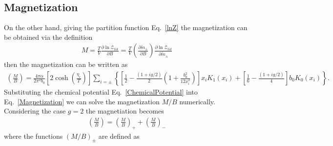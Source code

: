 \documentclass[Universe,article,submit,moreauthors,pdftex]{Definitions/mdpi}
\newcommand*{\req}[1]{Eq.~{\eqref{#1}}}
\begin{document}
\subsection{Magnetization}
On the other hand, giving the partition function \req{lnZ} the magnetization can be obtained via the definition
\begin{align}
M=\frac{T}{V}\frac{\partial \ln\mathcal{Z}_{tot}}{\partial B}=\frac{T}{V}\left(\frac{\partial\tilde m_\pm}{\partial B}\right)\frac{\partial \ln\mathcal{Z}_{tot}}{\partial\tilde m_\pm}
\end{align}
then the magnetization can be written as
\begin{align}\label{Magnetization}
\left(\frac{M}{B}\right)=\frac{4\pi\alpha}{2\pi^2b_0}\left[2\cosh\left(\frac{\eta_{e}}{T}\right)\right]\sum_{i=\pm}\left\{\left[\frac{1}{2}-\frac{(1+i g/2)}{2}\left(1+\frac{b^2_0}{12x^2_i}\right)\right]x_i K_1(x_i)+\left[\frac{1}{6}-\frac{(1+ig/2)}{4}\right]b_0K_0(x_i)\right\}.
\end{align}
Substituting the chemical potential \req{ChemicalPotential} into \req{Magnetization} we can solve the magnetization $M/B$ numerically.
Considering the case $g=2$ the magnetiation becomes
\begin{align}
\left(\frac{M}{B}\right)=\left(\frac{M}{B}\right)_++\left(\frac{M}{B}\right)
_-
\end{align}
where the functions $(M/B)_\pm$ are defined as 
\end{document}
